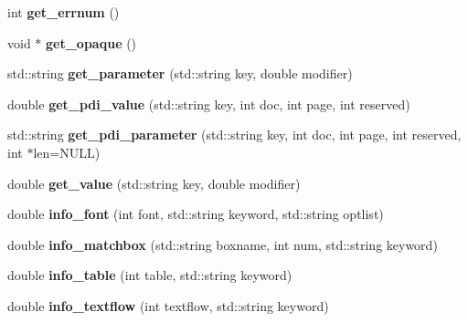 \begin{DoxyCompactItemize}
\item 
\hypertarget{classPDFlib_aa22b55c8aeb8c8bc42cc286003c29074}{int {\bfseries get\-\_\-errnum} ()}\label{classPDFlib_aa22b55c8aeb8c8bc42cc286003c29074}

\item 
\hypertarget{classPDFlib_a5b52bcdf06c0ca3c3a26ac8e07665266}{void $\ast$ {\bfseries get\-\_\-opaque} ()}\label{classPDFlib_a5b52bcdf06c0ca3c3a26ac8e07665266}

\item 
\hypertarget{classPDFlib_a6843d6ec87838920e015c5661b8a131c}{std\-::string {\bfseries get\-\_\-parameter} (std\-::string key, double modifier)}\label{classPDFlib_a6843d6ec87838920e015c5661b8a131c}

\item 
\hypertarget{classPDFlib_a29235793f31c496e5882e9000b80045e}{double {\bfseries get\-\_\-pdi\-\_\-value} (std\-::string key, int doc, int page, int reserved)}\label{classPDFlib_a29235793f31c496e5882e9000b80045e}

\item 
\hypertarget{classPDFlib_a2647307dc861fcbf3c0b994ea912afd0}{std\-::string {\bfseries get\-\_\-pdi\-\_\-parameter} (std\-::string key, int doc, int page, int reserved, int $\ast$len=\-N\-U\-L\-L)}\label{classPDFlib_a2647307dc861fcbf3c0b994ea912afd0}

\item 
\hypertarget{classPDFlib_a203140e53fe8f2e3660f2173a88c6f5b}{double {\bfseries get\-\_\-value} (std\-::string key, double modifier)}\label{classPDFlib_a203140e53fe8f2e3660f2173a88c6f5b}

\item 
\hypertarget{classPDFlib_a4691e67c4af969f8a30a27c67d0c7281}{double {\bfseries info\-\_\-font} (int font, std\-::string keyword, std\-::string optlist)}\label{classPDFlib_a4691e67c4af969f8a30a27c67d0c7281}

\item 
\hypertarget{classPDFlib_ab87d9425f72659393e4c82a3b70ad29e}{double {\bfseries info\-\_\-matchbox} (std\-::string boxname, int num, std\-::string keyword)}\label{classPDFlib_ab87d9425f72659393e4c82a3b70ad29e}

\item 
\hypertarget{classPDFlib_a8b9bee8fcc7b13463c134aadc202f237}{double {\bfseries info\-\_\-table} (int table, std\-::string keyword)}\label{classPDFlib_a8b9bee8fcc7b13463c134aadc202f237}

\item 
\hypertarget{classPDFlib_a8c325dd615c090dbc8c3a1a2c6be1c27}{double {\bfseries info\-\_\-textflow} (int textflow, std\-::string keyword)}\label{classPDFlib_a8c325dd615c090dbc8c3a1a2c6be1c27}


\end{DoxyCompactItemize}
